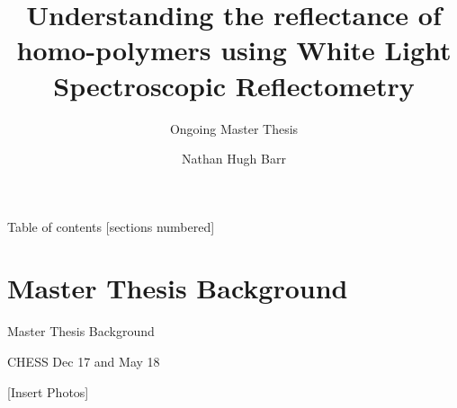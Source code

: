 \documentclass[10pt]{beamer}
\title{Understanding the reflectance of homo-polymers using White Light Spectroscopic Reflectometry}
\subtitle{Ongoing Master Thesis}
\date{}
\author{Nathan Hugh Barr}
\institute{Roskilde University}
\begin{document}
\maketitle

\begin{frame}{Table of contents}
  [sections numbered]
  \tableofcontents[hideallsubsections]
\end{frame}

	\section{Master Thesis Background}

	\begin{frame}{Master Thesis Background}

CHESS Dec 17 and May 18

[Insert Photos]

	\end{frame}
\end{document}
